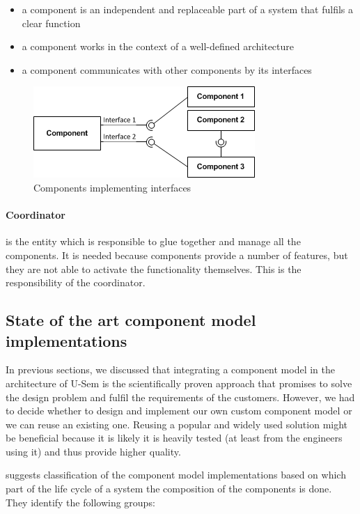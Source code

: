 \begin{itemize}
	\item a component is an independent and replaceable part of a system that fulfils a clear function
	\item a component works in the context of a well-defined architecture
	\item a component communicates with other components by its interfaces 
\end{itemize}

	\begin{figure}[h!]
  		\centering
  		\includegraphics[scale=0.75]{plug-in/component-services.png}
  		\caption{Components implementing interfaces }
  		\label{fig_comp}
	\end{figure}

\paragraph{Coordinator}
	is the entity which is responsible to glue together and manage all the components. It is needed because components provide a number of features, but they are not able to activate the functionality themselves. This is the responsibility of the coordinator.

\subsection{State of the art component model implementations}

In previous sections, we discussed that integrating a component model in the architecture of U-Sem is the scientifically proven approach that promises to solve the design problem and fulfil the requirements of the customers. However, we had to decide whether to design and implement our own custom component model or we can reuse an existing one. Reusing a popular and widely used solution might be beneficial because it is likely it is heavily tested (at least from the engineers using it) and thus provide higher quality. 

\cite{Lau} suggests classification of the component model implementations based on which part of the life cycle of a system the composition of the components is done. They identify the following groups:

